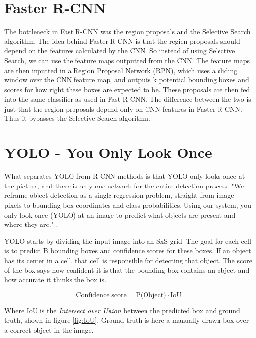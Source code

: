 \section{Faster R-CNN }
The bottleneck in Fast R-CNN was the region proposals and the Selective Search algorithm. The idea behind Faster R-CNN \citep{FasterR-CNN} is that the region proposals should depend on the features calculated by the CNN. So instead of using Selective Search, we can use the feature maps outputted from the CNN. The feature maps are then inputted in a Region Proposal Network (RPN), which uses a sliding window over the CNN feature map, and outputs k potential bounding boxes and scores for how right these boxes are expected to be. These proposals are then fed into the same classifier as used in Fast R-CNN. The difference between the two is just that the region proposals depend only on CNN features in Faster R-CNN. Thus it bypasses the Selective Search algorithm.



\section{YOLO - You Only Look Once }
\label{sec:yolo}
What separates YOLO \citep{YOLOv1} \citep{YOLOv2} \citep{YOLOv3} from R-CNN methods is that YOLO only looks once at the picture, and there is only one network for the entire detection process. "We reframe object detection as a single regression problem, straight from image pixels to bounding box coordinates and class probabilities. Using our system, you only look once (YOLO) at an image to predict what objects are present and where they are." \citep{YOLOv1}. 
\vspace{0.5cm}

YOLO starts by dividing the input image into an SxS grid. The goal for each cell is to predict B bounding boxes and confidence scores for these boxes. If an object has its center in a cell, that cell is responsible for detecting that object. The score of the box says how confident it is that the bounding box contains an object and how accurate it thinks the box is. 

\begin{equation}
    \text{Confidence score} = \text{P(Object)} \cdot \text{IoU}
\end{equation}

Where IoU is the \textit{Intersect over Union} between the predicted box and ground truth, shown in figure \ref{fig:IoU}. Ground truth is here a manually drawn box over a correct object in the image.



